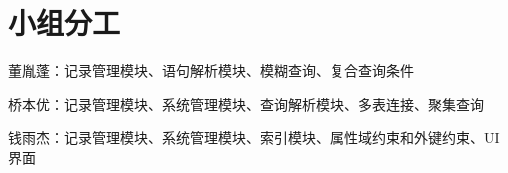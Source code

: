 
\chapter{小组分工} %

\label{Chapter5} %


董胤蓬：记录管理模块、语句解析模块、模糊查询、复合查询条件

桥本优：记录管理模块、系统管理模块、查询解析模块、多表连接、聚集查询

钱雨杰：记录管理模块、系统管理模块、索引模块、属性域约束和外键约束、UI界面


